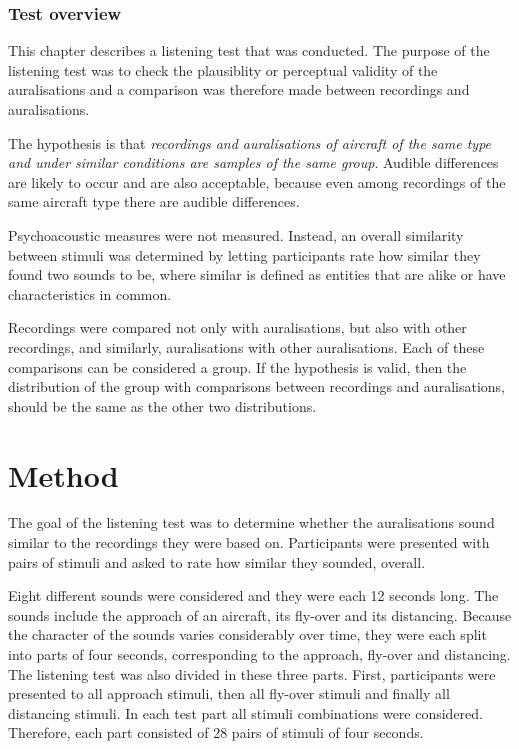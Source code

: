 \subsubsection*{Test overview}
This chapter describes a listening test that was conducted. The purpose of the
listening test was to check the plausiblity or perceptual validity of the
auralisations and a comparison was therefore made between recordings and
auralisations.

The hypothesis is that \emph{recordings and auralisations of aircraft of the same
type and under similar conditions are samples of the same group}.
Audible differences are likely to occur and are also acceptable, because even
among recordings of the same aircraft type there are audible differences.

Psychoacoustic measures were not measured. Instead, an overall similarity
between stimuli was determined by letting participants rate how similar they
found two sounds to be, where similar is defined as entities that are alike or
have characteristics in common.

Recordings were compared not only with auralisations,
but also with other recordings, and similarly, auralisations with other
auralisations. Each of these comparisons can be considered a group. If the
hypothesis is valid, then the distribution of the group with comparisons between
recordings and auralisations, should be the same as the other two distributions.

\section{Method}

The goal of the listening test was to determine whether the auralisations sound
similar to the recordings they were based on. Participants were presented with
pairs of stimuli and asked to rate how similar they sounded, overall.

Eight different sounds were considered and they were each 12 seconds long. The
sounds include the approach of an aircraft, its fly-over and its distancing.
Because the character of the sounds varies considerably over time, they were
each split into parts of four seconds, corresponding to the approach, fly-over
and distancing. The listening test was also divided in these three parts. First,
participants were presented to all approach stimuli, then all fly-over stimuli
and finally all distancing stimuli. In each test part all stimuli combinations
were considered. Therefore, each part consisted of 28 pairs of stimuli of four
seconds.

